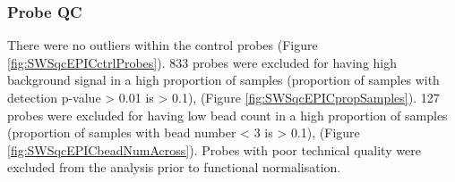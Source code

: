 \documentclass[
]{book}
\begin{document}
\hypertarget{probe-qc-2}{%
\subsubsection{Probe QC}\label{probe-qc-2}}

There were no outliers within the control probes (Figure \ref{fig:SWSqcEPICctrlProbes}).
833 probes were excluded for having high background signal in a high proportion of samples (proportion of samples with detection p-value \textgreater{} 0.01 is \textgreater{} 0.1), (Figure \ref{fig:SWSqcEPICpropSamples}).
127 probes were excluded for having low bead count in a high proportion of samples (proportion of samples with bead number \textless{} 3 is \textgreater{} 0.1), (Figure \ref{fig:SWSqcEPICbeadNumAcross}).
Probes with poor technical quality were excluded from the analysis prior to functional normalisation.
\end{document}
